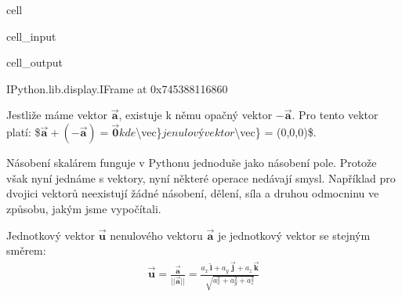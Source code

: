 \documentclass[letterpaper,10pt,english]{jupyterBook}
\begin{document}
\begin{sphinxuseclass}{cell}\begin{sphinxVerbatimInput}

\begin{sphinxuseclass}{cell_input}
\begin{sphinxVerbatim}[commandchars=\\\{\}]
  
\end{sphinxVerbatim}

\end{sphinxuseclass}\end{sphinxVerbatimInput}
\begin{sphinxVerbatimOutput}

\begin{sphinxuseclass}{cell_output}
\begin{sphinxVerbatim}[commandchars=\\\{\}]
\PYGZlt{}IPython.lib.display.IFrame at 0x745388116860\PYGZgt{}
\end{sphinxVerbatim}

\end{sphinxuseclass}\end{sphinxVerbatimOutput}

\end{sphinxuseclass}
\sphinxAtStartPar
Jestliže máme vektor \(\vec{{\mathbf{a}}}\), existuje k němu opačný vektor \(-\vec{{\mathbf{a}}}\). Pro tento vektor platí:
\$\(\vec{{\mathbf{a}}} + (-\vec{{\mathbf{a}}}) = \vec{{\mathbf{0}}}\)\(
kde \)\textbackslash{}vec\}\( je nulový vektor \)\textbackslash{}vec\} = (0,0,0)\$.

\sphinxAtStartPar
Násobení skalárem funguje v Pythonu jednoduše jako násobení pole. Protože však nyní jednáme s vektory, nyní některé operace nedávají smysl. Například pro dvojici vektorů neexistují žádné násobení, dělení, síla a druhou odmocninu ve způsobu, jakým jsme vypočítali.

\sphinxAtStartPar
Jednotkový vektor \(\vec{\mathbf{u}}\) nenulového vektoru \(\vec{\mathbf{a}}\) je jednotkový vektor se stejným směrem:
\begin{equation*}
\begin{split} \mathbf{\vec{u}} = \frac{\overrightarrow{\mathbf{a}}}{||\overrightarrow{\mathbf{a}}||} = \frac{a_x\,\hat{\mathbf{i}} + a_y\,\vec{\mathbf{j}} + a_z\, \vec{\mathbf{k}}}{\sqrt{a_x^2+a_y^2+a_z^2}} \end{split}
\end{equation*}
\end{document}
